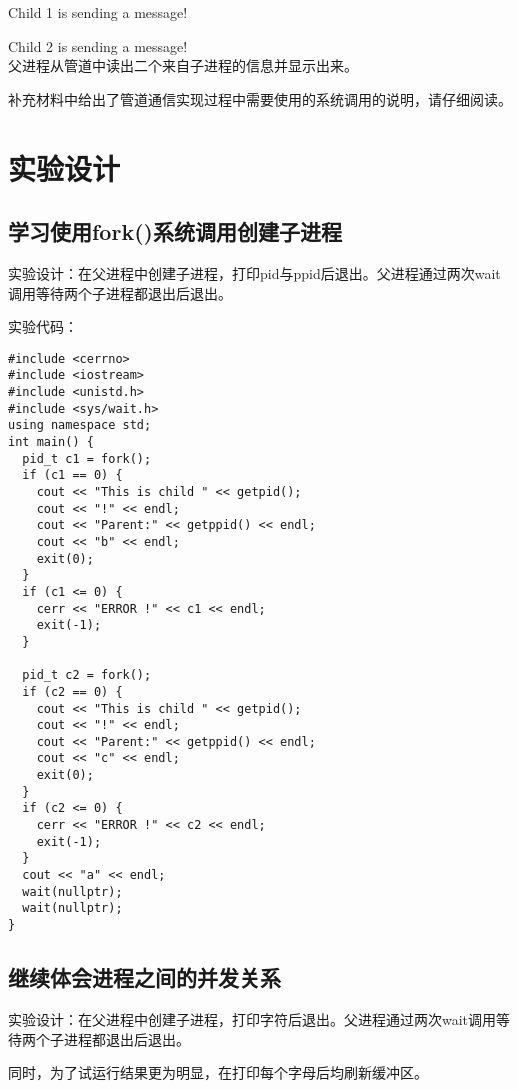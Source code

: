 \documentclass{ctexrep}
\begin{document}
Child 1 is sending a message!

Child 2 is sending a message! \\
父进程从管道中读出二个来自子进程的信息并显示出来。

补充材料中给出了管道通信实现过程中需要使用的系统调用的说明，请仔细阅读。


\section{实验设计}

\subsection{学习使用fork()系统调用创建子进程}

实验设计：在父进程中创建子进程，打印pid与ppid后退出。父进程通过两次wait调用等待两个子进程都退出后退出。

实验代码：
\begin{verbatim}
#include <cerrno>
#include <iostream>
#include <unistd.h>
#include <sys/wait.h>
using namespace std;
int main() {
  pid_t c1 = fork();
  if (c1 == 0) {
    cout << "This is child " << getpid();
    cout << "!" << endl;
    cout << "Parent:" << getppid() << endl;
    cout << "b" << endl;
    exit(0);
  }
  if (c1 <= 0) {
    cerr << "ERROR !" << c1 << endl;
    exit(-1);
  }

  pid_t c2 = fork();
  if (c2 == 0) {
    cout << "This is child " << getpid();
    cout << "!" << endl;
    cout << "Parent:" << getppid() << endl;
    cout << "c" << endl;
    exit(0);
  }
  if (c2 <= 0) {
    cerr << "ERROR !" << c2 << endl;
    exit(-1);
  }
  cout << "a" << endl;
  wait(nullptr);
  wait(nullptr);
}
\end{verbatim}

\subsection{继续体会进程之间的并发关系}

实验设计：在父进程中创建子进程，打印字符后退出。父进程通过两次wait调用等待两个子进程都退出后退出。

同时，为了试运行结果更为明显，在打印每个字母后均刷新缓冲区。
\end{document}
